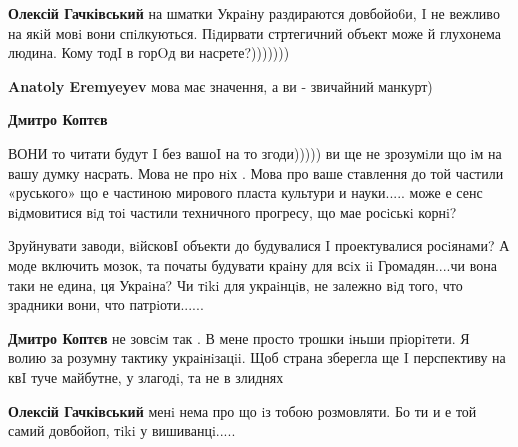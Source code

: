 \begin{itemize}
\begin{itemize}
\begin{itemize}
\textbf{Олексій Гачківський} на шматки Украiну раздираются довбойо6и, I не вежливо на якiй мовi вони спiлкуються. Пiдирвати стртегичний объект може й глухонема людина. Кому тодI в горOд ви насрете?)))))))

 
\textbf{Anatoly Eremyeyev} мова має значення, а ви - звичайний манкурт)

 
\textbf{Дмитро Коптєв} 

ВОНИ то читати будут I без вашоI на то згоди))))) ви ще не зрозумiли що iм на
вашу думку насрать. Мова не про нiх . Мова про ваше ставлення до той частили
«руського» що е частиною мирового пласта культури и науки..... може е сенс
вiдмовитися вiд тоi частили техничного прогресу, що мае росiськi корнi?

Зруйнувати заводи, вiйсковI объекти до будувалися I проектувалися росiянами? А
моде включить мозок, та початы будувати краiну для всiх ii Громадян....чи вона
таки не едина, ця Украiна? Чи тiki для украiнцiв, не залежно вiд того, что
зрадники вони, что патрiоти......

 
\textbf{Дмитро Коптєв} не зовсiм так . В мене просто трошки iньши прiорiтети. Я волию за розумну тактику украiнiзацii. Щоб страна зберегла ще I перспективу на квI туче майбутне, у злагодi, та не в злиднях

 
\textbf{Олексій Гачківський} менi нема про що iз тобою розмовляти. Бо ти и е той самий довбойоп, тiki у вишиванцi.....


\end{itemize}
\end{itemize}
\end{itemize}

